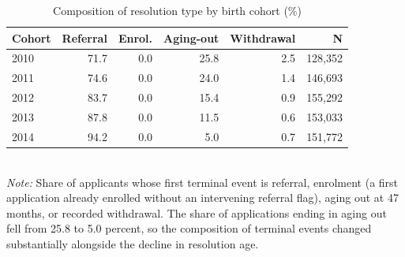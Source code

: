\begin{table}[htbp]\centering
\caption{Composition of resolution type by birth cohort (\%)}
\label{tab:P55type}
\footnotesize
\setlength{\tabcolsep}{5pt}
\begin{tabular}{lrrrrr}
\toprule
Cohort & Referral & Enrol. & Aging-out & Withdrawal & N \\
\midrule
2010 & 71.7 & 0.0 & 25.8 & 2.5 & 128,352 \\
2011 & 74.6 & 0.0 & 24.0 & 1.4 & 146,693 \\
2012 & 83.7 & 0.0 & 15.4 & 0.9 & 155,292 \\
2013 & 87.8 & 0.0 & 11.5 & 0.6 & 153,033 \\
2014 & 94.2 & 0.0 & 5.0 & 0.7 & 151,772 \\
\bottomrule
\end{tabular}
\\[3pt]{\footnotesize \textit{Note:} Share of applicants whose first terminal event is referral, enrolment (a first application already enrolled without an intervening referral flag), aging out at 47 months, or recorded withdrawal. The share of applications ending in aging out fell from 25.8 to 5.0 percent, so the composition of terminal events changed substantially alongside the decline in resolution age.}
\end{table}
